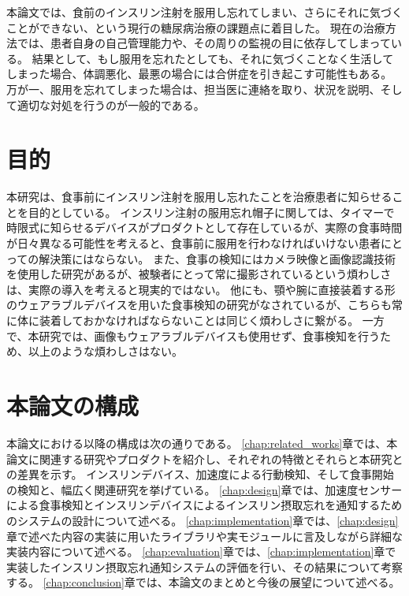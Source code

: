 本論文では、食前のインスリン注射を服用し忘れてしまい、さらにそれに気づくことができない、という現行の糖尿病治療の課題点に着目した。
現在の治療方法では、患者自身の自己管理能力や、その周りの監視の目に依存してしまっている。
結果として、もし服用を忘れたとしても、それに気づくことなく生活してしまった場合、体調悪化、最悪の場合には合併症を引き起こす可能性もある。
万が一、服用を忘れてしまった場合は、担当医に連絡を取り、状況を説明、そして適切な対処を行うのが一般的である。

\section{目的}
\label{section:purpose}

本研究は、食事前にインスリン注射を服用し忘れたことを治療患者に知らせることを目的としている。
インスリン注射の服用忘れ帽子に関しては、タイマーで時限式に知らせるデバイスがプロダクトとして存在しているが、実際の食事時間が日々異なる可能性を考えると、食事前に服用を行わなければいけない患者にとっての解決策にはならない。
また、食事の検知にはカメラ映像と画像認識技術を使用した研究があるが、被験者にとって常に撮影されているという煩わしさは、実際の導入を考えると現実的ではない。
他にも、顎や腕に直接装着する形のウェアラブルデバイスを用いた食事検知の研究がなされているが、こちらも常に体に装着しておかなければならないことは同じく煩わしさに繋がる。
一方で、本研究では、画像もウェアラブルデバイスも使用せず、食事検知を行うため、以上のような煩わしさはない。

\section{本論文の構成}
\label{section:structure}
本論文における以降の構成は次の通りである。
\ref{chap:related_works}章では、本論文に関連する研究やプロダクトを紹介し、それぞれの特徴とそれらと本研究との差異を示す。
インスリンデバイス、加速度による行動検知、そして食事開始の検知と、幅広く関連研究を挙げている。
\ref{chap:design}章では、加速度センサーによる食事検知とインスリンデバイスによるインスリン摂取忘れを通知するためのシステムの設計について述べる。
\ref{chap:implementation}章では、\ref{chap:design}章で述べた内容の実装に用いたライブラリや実モジュールに言及しながら詳細な実装内容について述べる。
\ref{chap:evaluation}章では、\ref{chap:implementation}章で実装したインスリン摂取忘れ通知システムの評価を行い、その結果について考察する。
\ref{chap:conclusion}章では、本論文のまとめと今後の展望について述べる。

